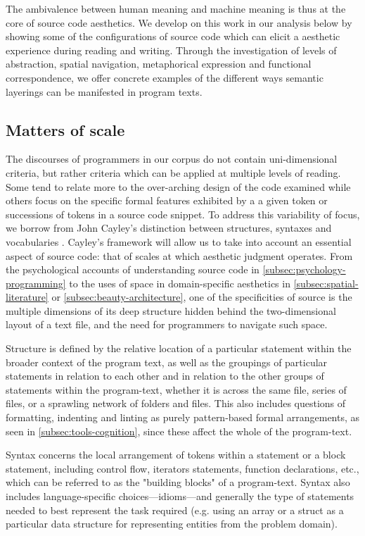 The ambivalence between human meaning and machine meaning is thus at the core of source code aesthetics. We develop on this work in our analysis below by showing some of the configurations of source code which can elicit a aesthetic experience during reading and writing. Through the investigation of levels of abstraction, spatial navigation, metaphorical expression and functional correspondence, we offer concrete examples of the different ways semantic layerings can be manifested in program texts.

\subsection{Matters of scale}
\label{subsec:matters-of-scale}

The discourses of programmers in our corpus do not contain uni-dimensional criteria, but rather criteria which can be applied at multiple levels of reading. Some tend to relate more to the over-arching design of the code examined while others focus on the specific formal features exhibited by a a given token or successions of tokens in a source code snippet. To address this variability of focus, we borrow from John Cayley's distinction between structures, syntaxes and vocabularies \citep{cayley_code_2012}.  Cayley's framework will allow us to take into account an essential aspect of source code: that of scales at which aesthetic judgment operates. From the psychological accounts of understanding source code in \autoref{subsec:psychology-programming} to the uses of space in domain-specific aesthetics in \autoref{subsec:spatial-literature} or \autoref{subsec:beauty-architecture}, one of the specificities of source is the multiple dimensions of its deep structure hidden behind the two-dimensional layout of a text file, and the need for programmers to navigate such space.

Structure is defined by the relative location of a particular statement within the broader context of the program text, as well as the groupings of particular statements in relation to each other and in relation to the other groups of statements within the program-text, whether it is across the same file, series of files, or a sprawling network of folders and files. This also includes questions of formatting, indenting and linting as purely pattern-based formal arrangements, as seen in \autoref{subsec:tools-cognition}, since these affect the whole of the program-text.

Syntax concerns the local arrangement of tokens within a statement or a block statement, including control flow, iterators statements, function declarations, etc., which can be referred to as the "building blocks" of a program-text. Syntax also includes language-specific choices—idioms—and generally the type of statements needed to best represent the task required (e.g. using an array or a struct as a particular data structure for representing entities from the problem domain).

